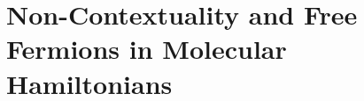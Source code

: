 \documentclass[%
 aip,
 amsmath,amssymb,
 reprint,%
]{revtex4-1}
\newtheorem{definition}{Definition}
\begin{document}

\section{Non-Contextuality and Free Fermions in Molecular Hamiltonians}
\label{sec:molecular-hamiltonians}
\end{document}
